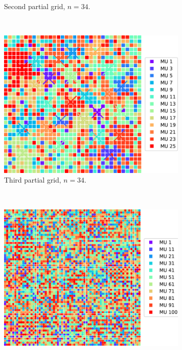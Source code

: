 \begin{figure}
\begin{subfigure}[t]{0.48\textwidth}
    \caption{Second partial grid, $n=34$.}%
    \label{fig:mu_3partial_2}%
  \end{subfigure}
  \,
  \begin{subfigure}[t]{0.48\textwidth}%
    \centering%
    \includegraphics[width=\textwidth]{images/motor_unit_assignment/MU_fibre_distribution_combined_67x67_100_2_2d_fiber_distribution_.pdf}%
    \caption{Third partial grid, $n=34$.}%
    \label{fig:mu_3partial_3}%
  \end{subfigure}
  \,
  \begin{subfigure}[t]{0.48\textwidth}%
    \centering%
    \includegraphics[width=\textwidth]{images/motor_unit_assignment/MU_fibre_distribution_combined_67x67_100_2d_fiber_distribution_.pdf}%

\end{subfigure}
\end{figure}
